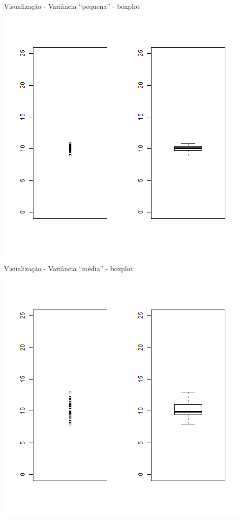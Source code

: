 \documentclass{beamer}
\begin{document}
\begin{frame}{Visualização - Variância ``pequena'' - boxplot}
  \begin{center}
    \includegraphics[height=.8\textheight]{Cap17/dot-box-P}
  \end{center}
\end{frame}

\begin{frame}{Visualização - Variância ``média'' - boxplot}
  \begin{center}
    \includegraphics[height=.8\textheight]{Cap17/dot-box-M}
  \end{center}
\end{frame}
\end{document}
